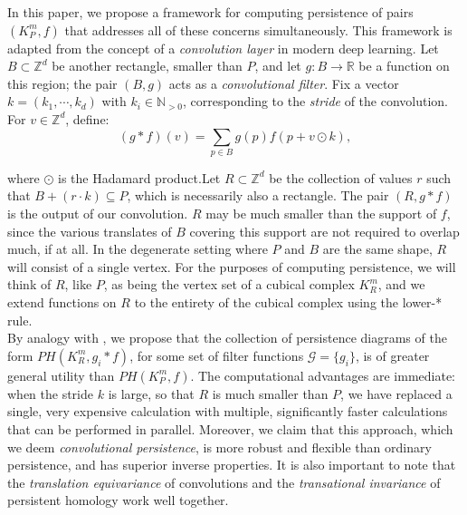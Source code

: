 \documentclass[12pt]{amsart}
\numberwithin{figure}{section}
\begin{document}
In this paper, we propose a framework for computing persistence of pairs $(K^{m}_{P},f)$ that addresses all of these concerns simultaneously. This framework is adapted from the concept of a \emph{convolution layer} in modern deep learning. Let $B \subset \mathbb{Z}^d$ be another rectangle, smaller than $P$, and let $g: B \to \mathbb{R}$ be a function on this region; the pair $(B,g)$ acts as a \emph{convolutional filter}. Fix a vector $k = (k_1, \cdots, k_d)$ with $k_i \in \mathbb{N}_{>0}$, corresponding to the \emph{stride} of the convolution. For $v \in \mathbb{Z}^d$, define:
\[(g \ast f)(v) = \sum_{p \in B} g(p)f(p+v \odot k),\]

where $\odot$ is the Hadamard product.Let $R \subset \mathbb{Z}^d$ be the collection of values $r$ such that $B + (r \cdot k) \subseteq P$, which is necessarily also a rectangle. The pair $(R, g \ast f)$ is the output of our convolution. $R$ may be much smaller than the support of $f$, since the various translates of $B$ covering this support are not required to overlap much, if at all. In the degenerate setting where $P$ and $B$ are the same shape, $R$ will consist of a single vertex. For the purposes of computing persistence, we will think of $R$, like $P$, as being the vertex set of a cubical complex $K_{R}^{m}$, and we extend functions on $R$ to the entirety of the cubical complex using the lower-* rule.\\

By analogy with \cite{solomon2021fast,solomon2021geometry}, we propose that the collection of persistence diagrams of the form $PH(K_{R}^{m},g_{i} \ast f)$, for some set of filter functions $\mathcal{G} = \{g_i\}$, is of greater general utility than $PH(K_{P}^{m},f)$. The computational advantages are immediate: when the stride $k$ is large, so that $R$ is much smaller than $P$, we have replaced a single, very expensive calculation with multiple, significantly faster calculations that can be performed in parallel. Moreover, we claim that this approach, which we deem \emph{convolutional persistence}, is more robust and flexible than ordinary persistence, and has superior inverse properties. It is also important to note that the \emph{translation equivariance} of convolutions and the \emph{transational invariance} of persistent homology work well together.\\

\end{document}
